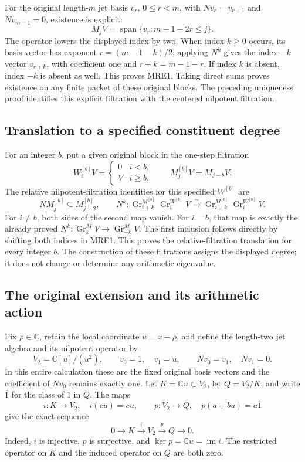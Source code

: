 For the original length-\(m\) jet basis \(v_r\), \(0\leq r<m\), with
\(Nv_r=v_{r+1}\) and \(Nv_{m-1}=0\), existence is explicit:
\[
 M_jV=\operatorname{span}\{v_r:m-1-2r\leq j\}.
 \tag{MRE4}
\]
The operator lowers the displayed index by two. When index \(k\geq0\)
occurs, its basis vector has exponent \(r=(m-1-k)/2\); applying \(N^k\)
gives the index-\(-k\) vector \(v_{r+k}\), with coefficient one and
\(r+k=m-1-r\). If index \(k\) is absent, index \(-k\) is absent as well.
This proves MRE1. Taking direct sums proves existence on any finite packet
of these original blocks. The preceding uniqueness proof identifies this
explicit filtration with the centered nilpotent filtration.

\subsection{Translation to a specified constituent degree}

For an integer \(b\), put a given original block in the one-step filtration
\[
 W_i^{[b]}V=
 \begin{cases}0&i<b,\\ V&i\geq b,\end{cases}
 \qquad
 M_j^{[b]}V=M_{j-b}V.
 \tag{MRE5}
\]
The relative nilpotent-filtration identities for this specified \(W^{[b]}\)
are
\[
 NM_j^{[b]}\subseteq M_{j-2}^{[b]},\qquad
 N^k:\operatorname{Gr}_{i+k}^{M^{[b]}}
             \operatorname{Gr}_i^{W^{[b]}}V
 \xrightarrow{\sim}
       \operatorname{Gr}_{i-k}^{M^{[b]}}
             \operatorname{Gr}_i^{W^{[b]}}V.
 \tag{MRE6}
\]
For \(i\ne b\), both sides of the second map vanish. For \(i=b\), that
map is exactly the already proved
\(N^k:\operatorname{Gr}_k^M V\to\operatorname{Gr}_{-k}^M V\).
The first inclusion follows directly by shifting both indices in MRE1.
This proves the relative-filtration translation for every integer \(b\).
The construction of these filtrations assigns the displayed degree; it
does not change or determine any arithmetic eigenvalue.

\subsection{The original extension and its arithmetic action}

Fix \(\rho\in\mathbb C\), retain the local coordinate \(u=x-\rho\), and
define the length-two jet algebra and its nilpotent operator by
\[
 V_2=\mathbb C[u]/(u^2),\qquad
 v_0=1,\quad v_1=u,\qquad
 Nv_0=v_1,\quad Nv_1=0.
 \tag{MRE7}
\]
In this entire calculation these are the fixed original basis vectors
and the coefficient of \(Nv_0\) remains exactly one.
Let \(K=\mathbb C u\subset V_2\), let \(Q=V_2/K\), and write
\(\overline{1}\) for the class of \(1\) in \(Q\). The maps
\[
 i:K\longrightarrow V_2,\quad i(cu)=cu,
 \qquad
 p:V_2\longrightarrow Q,\quad p(a+bu)=a\overline{1}
 \tag{MRE8}
\]
give the exact sequence
\[
 0\longrightarrow K\xrightarrow{i}V_2\xrightarrow{p}Q
   \longrightarrow0.
 \tag{MRE9}
\]
Indeed, \(i\) is injective, \(p\) is surjective, and
\(\ker p=\mathbb C u=\operatorname{im}i\). The restricted operator on
\(K\) and the induced operator on \(Q\) are both zero.

